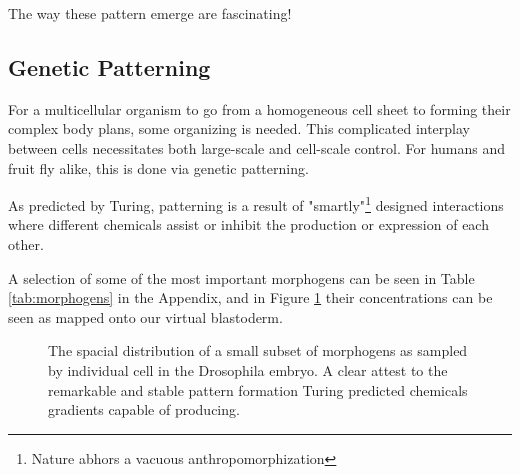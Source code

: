 The way these pattern emerge are fascinating! 



\subsection{Genetic Patterning}
\label{sec:gen_patterns}
For a multicellular organism to go from a homogeneous cell sheet to forming their complex body plans, some organizing is needed. This complicated interplay between cells necessitates both large-scale and cell-scale control. For humans and fruit fly alike, this is done via genetic patterning.\cite{veraksa2000developmental}

As predicted by Turing, patterning is a result of "smartly"\footnote{Nature abhors a vacuous anthropomorphization} designed interactions where different chemicals assist or inhibit the production or expression of each other. 


A selection of some of the most important morphogens can be seen in Table \ref{tab:morphogens} in the Appendix, and in Figure \ref{fig:MorphogenMap} their concentrations can be seen as mapped onto our virtual blastoderm.


\noindent

\begin{figure}[H]
    \centering
    \caption{The spacial distribution of a small subset of morphogens as sampled by individual cell in the Drosophila embryo. A clear attest to the remarkable and stable pattern formation Turing predicted chemicals gradients capable of producing.}
    \label{fig:MorphogenMap}
\end{figure}


